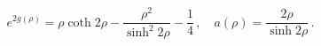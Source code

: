 \begin{equation}
e^{2g(\rho)}=\rho \coth 2\rho - \frac{\rho^2}{\sinh^2 2\rho}
-\frac{1}{4}\,, \quad a(\rho)=\frac{2\rho}{\sinh 2\rho}\,.
\end{equation}

